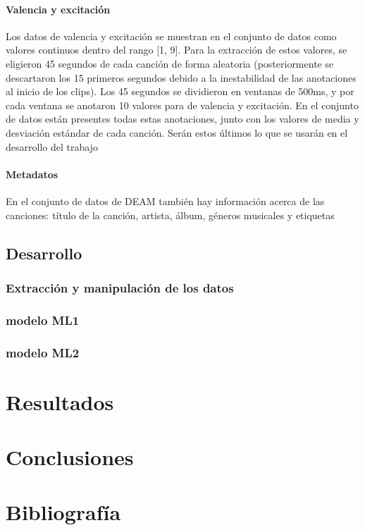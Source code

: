 \documentclass[12pt,a4paper,Spanish]{book}
\begin{document}
\subsubsection{Valencia y excitación}
Los datos de valencia y excitación se muestran en el conjunto de datos como valores continuos dentro del rango [1, 9].
\newline
Para la extracción de estos valores, se eligieron 45 segundos de cada canción de forma aleatoria (posteriormente se descartaron los 15 primeros segundos debido a la inestabilidad de las anotaciones al inicio de los clips). Los 45 segundos se dividieron en ventanas de 500ms, y por cada ventana se anotaron 10 valores para de valencia y excitación.
\newline
En el conjunto de datos están presentes todas estas anotaciones, junto con los valores de media y desviación estándar de cada canción. Serán estos últimos lo que se usarán en el desarrollo del trabajo

\subsubsection{Metadatos}
En el conjunto de datos de DEAM \cite{AlajankiEmoInMusicAnalysis} también hay información acerca de las canciones: título de la canción, artista, álbum, géneros musicales y etiquetas

\section{Desarrollo}
\subsection{Extracción y manipulación de los datos}
\subsection{modelo ML1}
\subsection{modelo ML2}
\chapter{Resultados}
\chapter{Conclusiones}

\chapter{Bibliografía}
\printbibliography
\end{document}
